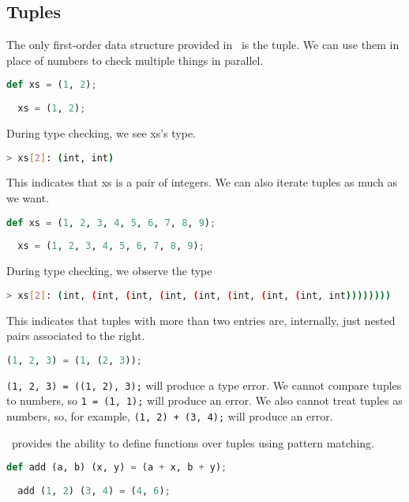\subsection{Tuples}

The only first-order data structure provided in \vampir\ is the tuple. We can use them in place of numbers to check multiple things in parallel.

\begin{lstlisting}[language=Python]
  def xs = (1, 2);
  
  xs = (1, 2);
\end{lstlisting}

During type checking, we see xs's type.

\begin{lstlisting}[language=bash]
  > xs[2]: (int, int)
\end{lstlisting}

This indicates that xs is a pair of integers. We can also iterate tuples as much as we want.

\begin{lstlisting}[language=Python]
  def xs = (1, 2, 3, 4, 5, 6, 7, 8, 9);
  
  xs = (1, 2, 3, 4, 5, 6, 7, 8, 9);
\end{lstlisting}

During type checking, we observe the type

\begin{lstlisting}[language=bash]
  > xs[2]: (int, (int, (int, (int, (int, (int, (int, (int, int))))))))
\end{lstlisting}

This indicates that tuples with more than two entries are, internally, just nested pairs associated to the right.

\begin{lstlisting}[language=Python]
  (1, 2, 3) = (1, (2, 3));
\end{lstlisting}

\lstinline{(1, 2, 3) = ((1, 2), 3);} will produce a type error. We cannot compare tuples to numbers, so \lstinline{1 = (1, 1);} will produce an error. We also cannot treat tuples as numbers, so, for example, \lstinline{(1, 2) + (3, 4);} will produce an error.

\vampir\ provides the ability to define functions over tuples using pattern matching.

\begin{lstlisting}[language=Python]
  def add (a, b) (x, y) = (a + x, b + y);
  
  add (1, 2) (3, 4) = (4, 6);
\end{lstlisting}

